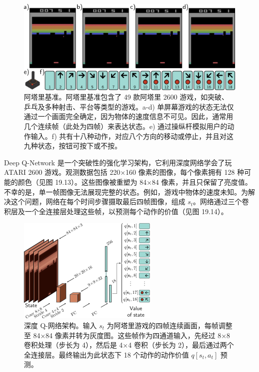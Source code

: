 \begin{figure}[ht!]
\centering
\includegraphics[width=0.7\linewidth]{png/chapter19/ReinforceDQL.png}
\caption{阿塔里基准。阿塔里基准包含了 49 款阿塔里 2600 游戏，如突破、乒乓及多种射击、平台等类型的游戏。a-d) 单屏幕游戏的状态无法仅通过一个画面完全确定，因为物体的速度信息不可见。因此，通常用几个连续帧（此处为四帧）来表达状态。e) 通过操纵杆模拟用户的动作输入。f) 共有十八种动作，对应八个方向的移动或停止，并且对这九种状态，按钮可按下或不按。}
\end{figure}

Deep Q-Network 是一个突破性的强化学习架构，它利用深度网络学会了玩 ATARI 2600 游戏。观测数据包括 220×160 像素的图像，每个像素拥有 128 种可能的颜色（见图 19.13）。这些图像被重塑为 84×84 像素，并且只保留了亮度值。不幸的是，单一帧图像无法展现完整的状态。例如，游戏中物体的速度未知。为解决这个问题，网络在每个时间步骤摄取最后四帧图像，组成 \(s_t\)。网络通过三个卷积层及一个全连接层处理这些帧，以预测每个动作的价值（见图 19.14）。


\begin{figure}[ht!]
\centering
\includegraphics[width=0.7\linewidth]{png/chapter19/ReinforceDQL2.png}
\caption{深度 Q-网络架构。输入 \(s_t\) 为阿塔里游戏的四帧连续画面，每帧调整至 84×84 像素并转为灰度图。这些帧作为四通道输入，先经过 8×8 卷积处理（步长为 4），然后是 4×4 卷积（步长为 2），最后通过两个全连接层。最终输出为此状态下 18 个动作的动作价值 \(q[s_t, a_t]\) 预测。}
\end{figure}

